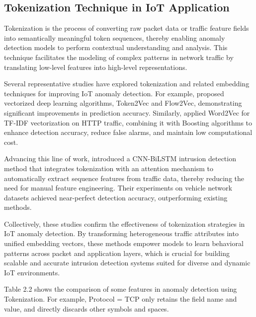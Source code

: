 \begin{ZhChapter}
    \section{Tokenization Technique in IoT Application}
    Tokenization is the process of converting raw packet data or traffic feature fields into semantically meaningful token sequences, thereby enabling anomaly detection models to perform contextual understanding and analysis. This technique facilitates the modeling of complex patterns in network traffic by translating low-level features into high-level representations.

    Several representative studies have explored tokenization and related embedding techniques for improving IoT anomaly detection. For example, \citeauthor{9054817} \cite{9054817} proposed vectorized deep learning algorithms, Token2Vec and Flow2Vec, demonstrating significant improvements in prediction accuracy. Similarly, \citeauthor{9154702} \cite{9154702} applied Word2Vec for TF-IDF vectorization on HTTP traffic, combining it with Boosting algorithms to enhance detection accuracy, reduce false alarms, and maintain low computational cost.

    Advancing this line of work, \citeauthor{10633284} \cite{10633284} introduced a CNN-BiLSTM intrusion detection method that integrates tokenization with an attention mechanism to automatically extract sequence features from traffic data, thereby reducing the need for manual feature engineering. Their experiments on vehicle network datasets achieved near-perfect detection accuracy, outperforming existing methods.



    Collectively, these studies confirm the effectiveness of tokenization strategies in IoT anomaly detection. By transforming heterogeneous traffic attributes into unified embedding vectors, these methods empower models to learn behavioral patterns across packet and application layers, which is crucial for building scalable and accurate intrusion detection systems suited for diverse and dynamic IoT environments.



    Table 2.2 shows the comparison of some features in anomaly detection using Tokenization. For example, Protocol = TCP only retains the field name and value, and directly discards other symbols and spaces.


\end{ZhChapter}
